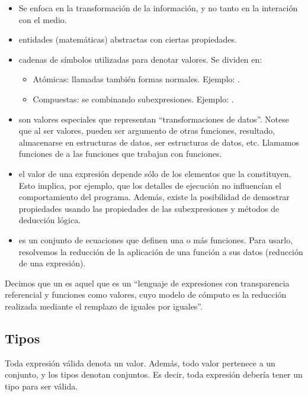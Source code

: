 \begin{itemize}
  \item Se enfoca en la transformación de la información, y no tanto en la interación con el medio.
  \item {} entidades (matemáticas) abstractas con ciertas propiedades.
  \item {} cadenas de símbolos utilizadas para denotar valores. Se dividen en:
    \begin{itemize}
      \item Atómicas: llamadas también formas normales. Ejemplo: .
      \item Compuestas: se  combinando subexpresiones. Ejemplo: .
    \end{itemize}
  \item {} son valores especiales que representan ``transformaciones de datos''. Notese que al ser valores, pueden ser argumento de otras funciones, resultado, almacenarse en estructuras de datos, ser estructuras de datos, etc. Llamamos funciones de  a las funciones que trabajan con funciones.
  \item {} el valor de una expresión depende sólo de los elementos que la constituyen. Esto implica, por ejemplo, que los detalles de ejecución no influencían el comportamiento del programa. Además, existe la posibilidad de demostrar propiedades usando las propiedades de las subexpresiones y métodos de deducción lógica.
  \item {} es un conjunto de ecuaciones que definen una o más funciones. Para usarlo, resolvemos la reducción de la aplicación de una función a sus datos (reducción de una expresión).
\end{itemize}

Decimos que un  es aquel que es un ``lenguaje de expresiones con transparencia referencial y funciones como valores, cuyo modelo de cómputo es la reducción realizada mediante el remplazo de iguales por iguales''.

\subsection{Tipos}

Toda expresión válida denota un valor. Además, todo valor pertenece a un conjunto, y los tipos denotan conjuntos.
Es decir, toda expresión debería tener un tipo para ser válida.

